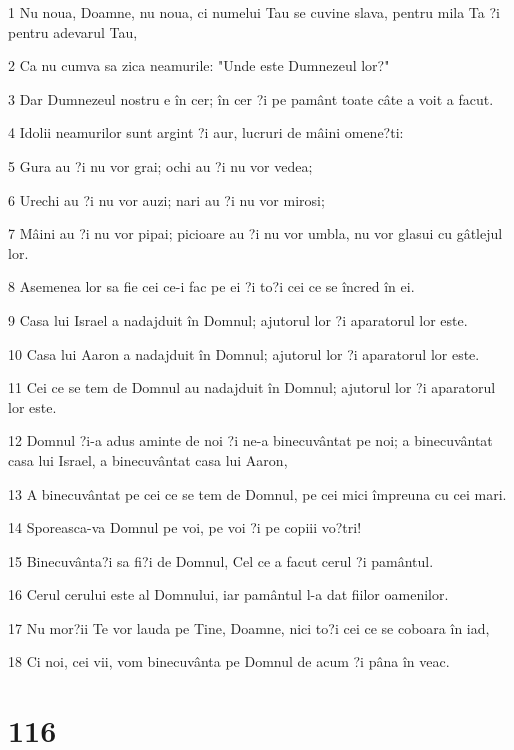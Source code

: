 \par 1 Nu noua, Doamne, nu noua, ci numelui Tau se cuvine slava, pentru mila Ta ?i pentru adevarul Tau,
\par 2 Ca nu cumva sa zica neamurile: "Unde este Dumnezeul lor?"
\par 3 Dar Dumnezeul nostru e în cer; în cer ?i pe pamânt toate câte a voit a facut.
\par 4 Idolii neamurilor sunt argint ?i aur, lucruri de mâini omene?ti:
\par 5 Gura au ?i nu vor grai; ochi au ?i nu vor vedea;
\par 6 Urechi au ?i nu vor auzi; nari au ?i nu vor mirosi;
\par 7 Mâini au ?i nu vor pipai; picioare au ?i nu vor umbla, nu vor glasui cu gâtlejul lor.
\par 8 Asemenea lor sa fie cei ce-i fac pe ei ?i to?i cei ce se încred în ei.
\par 9 Casa lui Israel a nadajduit în Domnul; ajutorul lor ?i aparatorul lor este.
\par 10 Casa lui Aaron a nadajduit în Domnul; ajutorul lor ?i aparatorul lor este.
\par 11 Cei ce se tem de Domnul au nadajduit în Domnul; ajutorul lor ?i aparatorul lor este.
\par 12 Domnul ?i-a adus aminte de noi ?i ne-a binecuvântat pe noi; a binecuvântat casa lui Israel, a binecuvântat casa lui Aaron,
\par 13 A binecuvântat pe cei ce se tem de Domnul, pe cei mici împreuna cu cei mari.
\par 14 Sporeasca-va Domnul pe voi, pe voi ?i pe copiii vo?tri!
\par 15 Binecuvânta?i sa fi?i de Domnul, Cel ce a facut cerul ?i pamântul.
\par 16 Cerul cerului este al Domnului, iar pamântul l-a dat fiilor oamenilor.
\par 17 Nu mor?ii Te vor lauda pe Tine, Doamne, nici to?i cei ce se coboara în iad,
\par 18 Ci noi, cei vii, vom binecuvânta pe Domnul de acum ?i pâna în veac.

\chapter{116}

